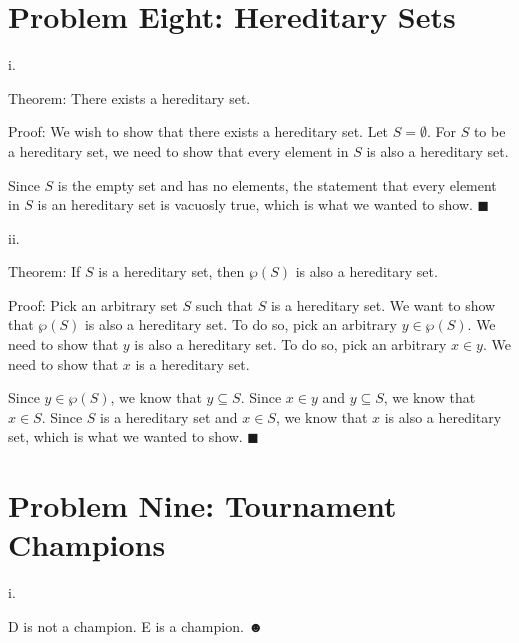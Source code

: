 \documentclass{article}
\renewcommand{\(}{\left(}
\renewcommand{\)}{\right)}
\newcommand{\powerset}[1]{\wp\left(#1\right)}
\theoremstyle{plain}
\theoremstyle{plain}
\theoremstyle{definition}
\begin{document}
\newpage

\section*{Problem Eight: Hereditary Sets}
    i.
    \begin{shaded}
                Theorem: There exists a hereditary set.

                \vspace{4mm}

                Proof: We wish to show that there exists a hereditary set. Let $S=\emptyset$. For $S$ to be a hereditary set, we need to show that every element in $S$ is also a hereditary set.

                \vspace{4mm}

                Since $S$ is the empty set and has no elements, the statement that every element in $S$ is an hereditary set is vacuosly true, which is what we wanted to show. $\blacksquare$
    \end{shaded}
        
    ii.
    \begin{shaded}
                Theorem: If $S$ is a hereditary set, then $\powerset{S}$ is also a hereditary set.
                
                \vspace{4mm}

                Proof: Pick an arbitrary set $S$ such that $S$ is a hereditary set. We want to show that $\powerset{S}$ is also a hereditary set. To do so, pick an arbitrary $y\in \powerset{S}$. We need to show that $y$ is also a hereditary set. To do so, pick an arbitrary $x\in y$. We need to show that $x$ is a hereditary set.
                
                \vspace{4mm}

                Since $y\in \powerset{S}$, we know that $y\subseteq S$. Since $x \in y$ and $y\subseteq S$, we know that $x \in S$. Since $S$ is a hereditary set and $x\in S$, we know that $x$ is also a hereditary set, which is what we wanted to show. $\blacksquare$
    \end{shaded}
    
\newpage

\section*{Problem Nine: Tournament Champions}
    i.
    \begin{shaded}
                D is not a champion. E is a champion. $\blacksmiley$
    \end{shaded}
    
\end{document}
